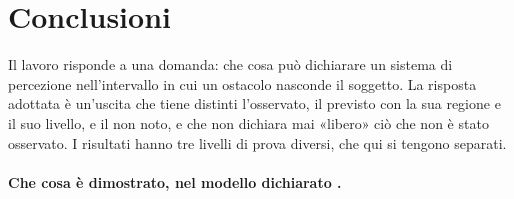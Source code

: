 \section{Conclusioni}\label{sec:con}

Il lavoro risponde a una domanda: che cosa può dichiarare un sistema di percezione nell'intervallo in cui un ostacolo nasconde il soggetto. La risposta adottata è un'uscita che tiene distinti l'osservato, il previsto con la sua regione e il suo livello, e il non noto, e che non dichiara mai «libero» ciò che non è stato osservato. I risultati hanno tre livelli di prova diversi, che qui si tengono separati.

\paragraph{Che cosa è dimostrato, nel modello dichiarato .}
